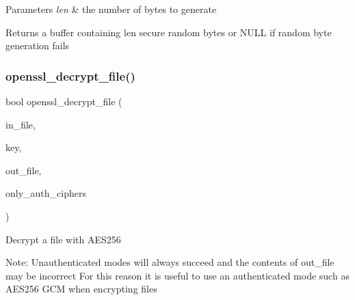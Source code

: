 \begin{DoxyParams}{Parameters}
{\em len} & the number of bytes to generate \\
\hline
\end{DoxyParams}
\begin{DoxyReturn}{Returns}
a buffer containing \textquotesingle{}len\textquotesingle{} secure random bytes or N\+U\+LL if random byte generation fails 
\end{DoxyReturn}
\mbox{\label{group__openssl__crypto_gaf1faa509e06c188acfbdf43e2197c61a}} 
\subsubsection{\texorpdfstring{openssl\+\_\+decrypt\+\_\+file()}{openssl\_decrypt\_file()}}
{\footnotesize\ttfamily bool openssl\+\_\+decrypt\+\_\+file (\begin{DoxyParamCaption}\item[{F\+I\+LE $\ast$}]{in\+\_\+file,  }\item[{const \hyperlink{structwickr__cipher__key}{wickr\+\_\+cipher\+\_\+key\+\_\+t} $\ast$}]{key,  }\item[{F\+I\+LE $\ast$}]{out\+\_\+file,  }\item[{bool}]{only\+\_\+auth\+\_\+ciphers }\end{DoxyParamCaption})}

Decrypt a file with A\+E\+S256

Note\+: Unauthenticated modes will always succeed and the contents of \textquotesingle{}out\+\_\+file\textquotesingle{} may be incorrect For this reason it is useful to use an authenticated mode such as A\+E\+S256 G\+CM when encrypting files


